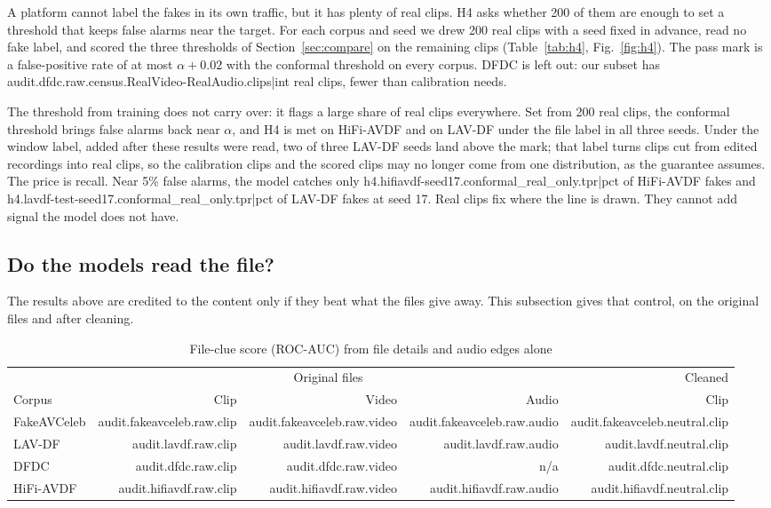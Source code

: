 \documentclass[conference]{IEEEtran}
\begin{document}
A platform cannot label the fakes in its own traffic, but it has plenty of real
clips. H4 asks whether 200 of them are enough to set a threshold that keeps
false alarms near the target. For each corpus and seed we drew 200 real clips
with a seed fixed in advance, read no fake label, and scored the three
thresholds of Section~\ref{sec:compare} on the remaining clips
(Table~\ref{tab:h4}, Fig.~\ref{fig:h4}). The pass mark is a false-positive rate
of at most $\alpha + 0.02$ with the conformal threshold on every corpus. DFDC is
left out: our subset has {{audit.dfdc.raw.census.RealVideo-RealAudio.clips|int}}
real clips, fewer than calibration needs.

The threshold from training does not carry over: it flags a large share of real
clips everywhere. Set from 200 real clips, the conformal threshold brings false
alarms back near $\alpha$, and H4 is met on HiFi-AVDF and on LAV-DF under the
file label in all three seeds. Under the window label, added after these results
were read, two of three LAV-DF seeds land above the mark; that label turns clips
cut from edited recordings into real clips, so the calibration clips and the
scored clips may no longer come from one distribution, as the guarantee
assumes. The price is recall. Near 5\% false alarms, the model catches only
{{h4.hifiavdf-seed17.conformal_real_only.tpr|pct}} of HiFi-AVDF fakes and
{{h4.lavdf-test-seed17.conformal_real_only.tpr|pct}} of LAV-DF fakes at
seed 17. Real clips fix where the line is drawn. They cannot add signal the
model does not have.

\subsection{Do the models read the file?}
\label{sec:files}

The results above are credited to the content only if they beat what the
files give away. This subsection gives that control, on the original files
and after cleaning.

\begin{table}[htbp]
\caption{File-clue score (ROC-AUC) from file details and audio edges alone}
\label{tab:ceiling}
\centering
\begin{tabular}{lrrrr}
\toprule
 & \multicolumn{3}{c}{Original files} & Cleaned \\
\cmidrule(lr){2-4}
Corpus & Clip & Video & Audio & Clip \\
\midrule
FakeAVCeleb & {{audit.fakeavceleb.raw.clip}} & {{audit.fakeavceleb.raw.video}} & {{audit.fakeavceleb.raw.audio}} & {{audit.fakeavceleb.neutral.clip}} \\
LAV-DF & {{audit.lavdf.raw.clip}} & {{audit.lavdf.raw.video}} & {{audit.lavdf.raw.audio}} & {{audit.lavdf.neutral.clip}} \\
DFDC & {{audit.dfdc.raw.clip}} & {{audit.dfdc.raw.video}} & n/a & {{audit.dfdc.neutral.clip}} \\
HiFi-AVDF & {{audit.hifiavdf.raw.clip}} & {{audit.hifiavdf.raw.video}} & {{audit.hifiavdf.raw.audio}} & {{audit.hifiavdf.neutral.clip}} \\
\bottomrule
\end{tabular}
\end{table}
\end{document}
